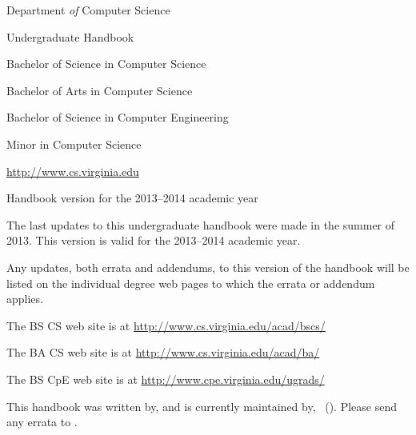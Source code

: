 \documentclass[10pt,letter,twocolumn]{book}
\begin{document}
\pagestyle{empty}

\begin{figure*}[h!]

\vspace*{0.5in}

\begin{center}

\vspace{0.75in}

{\huge Department {\em of} Computer Science}

\vspace{12pt}

{\huge Undergraduate Handbook}

\vspace{1in}

{\Large Bachelor of Science in Computer Science}

{\Large Bachelor of Arts in Computer Science}

{\Large Bachelor of Science in Computer Engineering}

{\Large Minor in Computer Science}

\vspace{1in}

{\large \url{http://www.cs.virginia.edu}}

\vspace{0.1in}

{\large Handbook version for the 2013--2014 academic year}
\end{center}
\end{figure*}

\clearpage


\begin{figure*}[h!]
\begin{center}
\parbox{3in} {The last updates to this undergraduate handbook were
  made in the summer of 2013.  This version is valid for the
  2013--2014 academic year.
\newline

Any updates, both errata and addendums, to this version of the
handbook will be listed on the individual degree web pages to which
the errata or addendum applies.
\newline

The BS CS web site is at
\url{http://www.cs.virginia.edu/acad/bscs/}
\newline

The BA CS web site is at
\url{http://www.cs.virginia.edu/acad/ba/}
\newline

The BS CpE web site is at
\url{http://www.cpe.virginia.edu/ugrads/}
\newline

This handbook was written by, and is currently maintained by,
\handbookmaintainer\ (\handbookmaintaineremail).  Please send any
errata to \handbookmaintainerpronoun.

}
\end{center}
\end{figure*}
\end{document}
